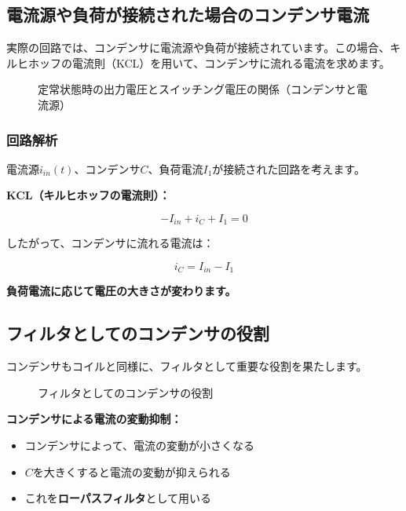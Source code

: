 \subsection{電流源や負荷が接続された場合のコンデンサ電流}

実際の回路では、コンデンサに電流源や負荷が接続されています。この場合、キルヒホッフの電流則（KCL）を用いて、コンデンサに流れる電流を求めます。

\begin{figure}[H]
\centering
{}
\caption{定常状態時の出力電圧とスイッチング電圧の関係（コンデンサと電流源）}
\label{fig:ch04_capacitor_load}
\end{figure}

\subsubsection{回路解析}

電流源$i_{in}(t)$、コンデンサ$C$、負荷電流$I_1$が接続された回路を考えます。

\textbf{KCL（キルヒホッフの電流則）：}

\begin{equation}
-I_{in} + i_C + I_1 = 0
\end{equation}

したがって、コンデンサに流れる電流は：

\begin{equation}
i_C = I_{in} - I_1
\end{equation}

\textbf{負荷電流に応じて電圧の大きさが変わります。}

\subsection{フィルタとしてのコンデンサの役割}

コンデンサもコイルと同様に、フィルタとして重要な役割を果たします。

\begin{figure}[H]
\centering
{}
\caption{フィルタとしてのコンデンサの役割}
\label{fig:ch04_capacitor_filter}
\end{figure}

\textbf{コンデンサによる電流の変動抑制：}

\begin{itemize}
\item コンデンサによって、電流の変動が小さくなる
\item $C$を大きくすると電流の変動が抑えられる
\item これを\textbf{ローパスフィルタ}として用いる
\end{itemize}

